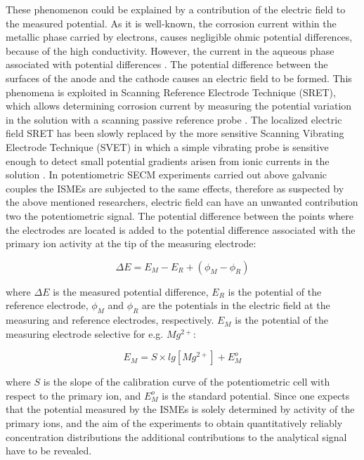 \documentclass[3p]{elsarticle}
\begin{document}
These phenomenon could be explained by a contribution of the electric field to the measured potential. As it is well-known, the corrosion current within the metallic phase carried by electrons, causes negligible ohmic potential differences, because of the high conductivity. However, the current in the aqueous phase associated with potential differences \cite{Isaacsfield}. 
The potential difference between the surfaces of the anode and the cathode causes an electric field to be formed. 
This phenomena is exploited in Scanning Reference Electrode Technique (SRET), which allows determining corrosion current by measuring the potential variation in the solution with a scanning passive reference probe \cite{SRET1, SRET2, SRET3, SRET4}. 
The localized electric field SRET has been slowly replaced by the more sensitive Scanning Vibrating Electrode Technique (SVET) in which a simple vibrating probe is sensitive enough to detect small potential gradients arisen from ionic currents in the solution \cite{SVET}. 
In potentiometric SECM experiments carried out above galvanic couples the ISMEs are subjected to the same effects, therefore as suspected by the above mentioned researchers, electric field can have an unwanted contribution two the potentiometric signal. 
The potential difference between the points where the electrodes are located is added to the potential difference associated with the primary ion activity at the tip of the measuring electrode:

\begin{equation}
\Delta E=E_M-E_R + (\phi_M - \phi_R)
\label{eq:potential}
\end{equation}

where $\Delta E$ is the measured potential difference, $E_R$ is the potential of the reference electrode, $\phi_M$ and $\phi_R$ are the potentials in the electric field at the measuring and reference electrodes, respectively. $E_M$ is the potential of the measuring electrode selective for e.g. $Mg^{2+}$:

\begin{equation}
E_M = S \times lg[Mg^{2+}] + E_M^o
\label{eq:measuring}
\end{equation}

where $S$ is the slope of the calibration curve of the potentiometric cell with respect to the primary ion, and $E_M^o$ is the standard potential.
Since one expects that the potential measured by the ISMEs is solely determined by activity of the primary ions, and the aim of the experiments to obtain quantitatively reliably concentration distributions the additional contributions to the analytical signal have to be revealed.
\end{document}
